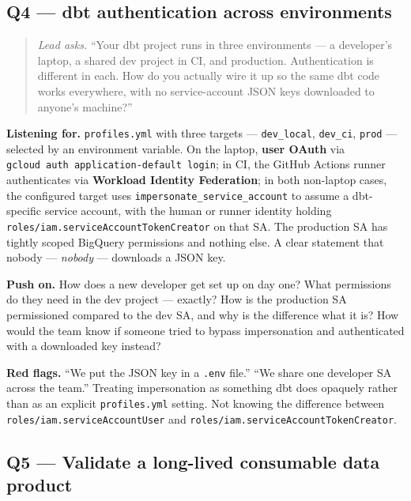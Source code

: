 \documentclass[
  11pt,
  british,
  oneside]{book}
\begin{document}
\hypertarget{q4-dbt-authentication-across-environments}{%
\subsection{Q4 --- dbt authentication across
environments}\label{q4-dbt-authentication-across-environments}}

\begin{quote}
\emph{Lead asks.} ``Your dbt project runs in three environments --- a
developer's laptop, a shared dev project in CI, and production.
Authentication is different in each. How do you actually wire it up so
the same dbt code works everywhere, with no service-account JSON keys
downloaded to anyone's machine?''
\end{quote}

\textbf{Listening for.} \texttt{profiles.yml} with
three targets --- \texttt{dev\_local}, \texttt{dev\_ci}, \texttt{prod}
--- selected by an environment variable. On the laptop, \textbf{user
OAuth} via \texttt{gcloud\ auth\ application-default\ login}; in CI, the
GitHub Actions runner authenticates via \textbf{Workload Identity
Federation}; in both non-laptop
cases, the configured target uses
\texttt{impersonate\_service\_account}
to assume a dbt-specific service account, with the human or runner
identity holding \texttt{roles/iam.serviceAccountTokenCreator} on that
SA. The production SA has tightly scoped BigQuery permissions and
nothing else. A clear statement that nobody --- \emph{nobody} ---
downloads a JSON key.

\textbf{Push on.} How does a new developer get set up on day one? What
permissions do they need in the dev project --- exactly? How is the
production SA permissioned compared to the dev SA, and why is the
difference what it is? How would the team know if someone tried to
bypass impersonation and authenticated with a downloaded key instead?

\textbf{Red flags.} ``We put the JSON key in a \texttt{.env} file.''
``We share one developer SA across the team.'' Treating impersonation as
something dbt does opaquely rather than as an explicit
\texttt{profiles.yml} setting. Not knowing the difference between
\texttt{roles/iam.serviceAccountUser} and
\texttt{roles/iam.serviceAccountTokenCreator}.

\hypertarget{q5-validate-a-long-lived-consumable-data-product}{%
\subsection{Q5 --- Validate a long-lived consumable data
product}\label{q5-validate-a-long-lived-consumable-data-product}}
\end{document}
